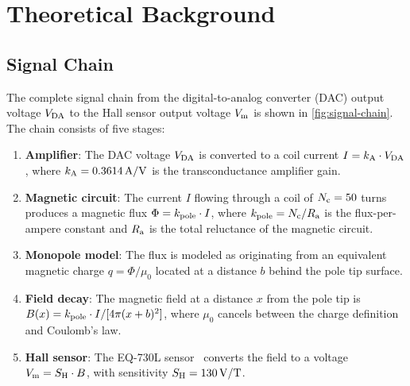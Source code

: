 \section{Theoretical Background}
\label{sec:theory}

\subsection{Signal Chain}
\label{sec:signal-chain}

The complete signal chain from the digital-to-analog converter (DAC) output
voltage $V_\mathrm{DA}$ to the Hall sensor output voltage $V_\mathrm{m}$ is shown in
\cref{fig:signal-chain}. The chain consists of five stages:

\begin{enumerate}
\item \textbf{Amplifier}: The DAC voltage $V_\mathrm{DA}$ is converted to a coil current
$I = k_\mathrm{A} \cdot V_\mathrm{DA}$, where $k_\mathrm{A} = \SI{0.3614}{\ampere/\volt}$ is the
transconductance amplifier gain.

\item \textbf{Magnetic circuit}: The current $I$ flowing through a coil of
$N_\mathrm{c} = 50$ turns produces a magnetic flux $\Phi = k_\mathrm{pole} \cdot I$, where
$k_\mathrm{pole} = N_\mathrm{c} / R_\mathrm{a}$ is the flux-per-ampere constant and $R_\mathrm{a}$ is the total
reluctance of the magnetic circuit.

\item \textbf{Monopole model}: The flux is modeled as originating from an
equivalent magnetic charge $q = \Phi / \mu_0$ located at a distance $b$
behind the pole tip surface.

\item \textbf{Field decay}: The magnetic field at a distance $x$ from the
pole tip is $B(x) = k_\mathrm{pole} \cdot I / [4\pi (x+b)^2]$, where $\mu_0$
cancels between the charge definition and Coulomb's law.

\item \textbf{Hall sensor}: The EQ-730L sensor~\cite{EQ730L} converts the
field to a voltage $V_\mathrm{m} = S_\mathrm{H} \cdot B$, with sensitivity
$S_\mathrm{H} = \SI{130}{\volt/\tesla}$.
\end{enumerate}

